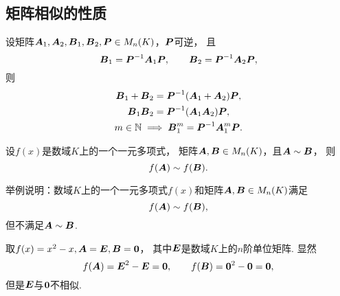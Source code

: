 \subsection{矩阵相似的性质}
\begin{proposition}
设矩阵\(\boldsymbol{A}_1,\boldsymbol{A}_2,\boldsymbol{B}_1,\boldsymbol{B}_2,\boldsymbol{P} \in M_n(K)\)，\(\boldsymbol{P}\)可逆，
且\[
	\boldsymbol{B}_1=\boldsymbol{P}^{-1}\boldsymbol{A}_1\boldsymbol{P}, \qquad
	\boldsymbol{B}_2=\boldsymbol{P}^{-1}\boldsymbol{A}_2\boldsymbol{P},
\]
则\begin{gather}
	\boldsymbol{B}_1 + \boldsymbol{B}_2 = \boldsymbol{P}^{-1} (\boldsymbol{A}_1 + \boldsymbol{A}_2) \boldsymbol{P}, \\
	\boldsymbol{B}_1 \boldsymbol{B}_2 = \boldsymbol{P}^{-1} (\boldsymbol{A}_1 \boldsymbol{A}_2) \boldsymbol{P}, \\
	m\in\mathbb{N} \implies \boldsymbol{B}_1^m = \boldsymbol{P}^{-1}\boldsymbol{A}_1^m\boldsymbol{P}.
		\label{equation:相似矩阵.利用相似性简化计算}
\end{gather}
\end{proposition}
\begin{corollary}\label{theorem:相似矩阵.相似矩阵的多项式相似}
设\(f(x)\)是数域\(K\)上的一个一元多项式，
矩阵\(\boldsymbol{A},\boldsymbol{B} \in M_n(K)\)，且\(\boldsymbol{A} \sim \boldsymbol{B}\)，
则\[
	f(\boldsymbol{A}) \sim f(\boldsymbol{B}).
\]
\end{corollary}
\begin{example}
举例说明：数域\(K\)上的一个一元多项式\(f(x)\)和矩阵\(\boldsymbol{A},\boldsymbol{B} \in M_n(K)\)满足\begin{equation*}
	f(\boldsymbol{A}) \sim f(\boldsymbol{B}),
\end{equation*}
但不满足\(\boldsymbol{A} \sim \boldsymbol{B}\).
\begin{solution}
取\(f(x) = x^2 - x,
\boldsymbol{A} = \boldsymbol{E},
\boldsymbol{B} = \boldsymbol0\)，
其中\(\boldsymbol{E}\)是数域\(K\)上的\(n\)阶单位矩阵.
显然\begin{equation*}
	f(\boldsymbol{A}) = \boldsymbol{E}^2 - \boldsymbol{E} = \boldsymbol0,
	\qquad
	f(\boldsymbol{B}) = \boldsymbol0^2 - \boldsymbol0 = \boldsymbol0,
\end{equation*}
但是\(\boldsymbol{E}\)与\(\boldsymbol0\)不相似.
\end{solution}
\end{example}

